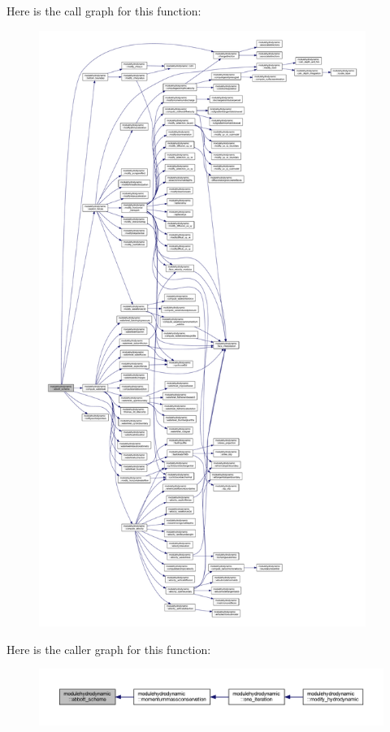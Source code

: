 Here is the call graph for this function\+:\nopagebreak
\begin{figure}[H]
\begin{center}
\leavevmode
\includegraphics[height=550pt]{namespacemodulehydrodynamic_ab24f3a1aadd0e5ea548005ab690517a5_cgraph}
\end{center}
\end{figure}
Here is the caller graph for this function\+:\nopagebreak
\begin{figure}[H]
\begin{center}
\leavevmode
\includegraphics[width=350pt]{namespacemodulehydrodynamic_ab24f3a1aadd0e5ea548005ab690517a5_icgraph}
\end{center}
\end{figure}
\mbox{\label{namespacemodulehydrodynamic_a106c8a097031ad23a85c1c2487284b7f}} 
